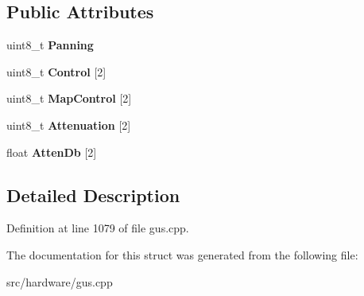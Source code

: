 \subsection*{Public Attributes}
\begin{DoxyCompactItemize}
\item 
\hypertarget{structgus__ICS2101_1_1mixcontrol_a51061e6484c9e123414be0af811b714f}{uint8\-\_\-t {\bfseries Panning}}\label{structgus__ICS2101_1_1mixcontrol_a51061e6484c9e123414be0af811b714f}

\item 
\hypertarget{structgus__ICS2101_1_1mixcontrol_abc998b7038d01a551dbc659027d54f66}{uint8\-\_\-t {\bfseries Control} \mbox{[}2\mbox{]}}\label{structgus__ICS2101_1_1mixcontrol_abc998b7038d01a551dbc659027d54f66}

\item 
\hypertarget{structgus__ICS2101_1_1mixcontrol_a916268f834849e724a87c1f6510bb964}{uint8\-\_\-t {\bfseries Map\-Control} \mbox{[}2\mbox{]}}\label{structgus__ICS2101_1_1mixcontrol_a916268f834849e724a87c1f6510bb964}

\item 
\hypertarget{structgus__ICS2101_1_1mixcontrol_afb5439928a40cd9679b7128298f92702}{uint8\-\_\-t {\bfseries Attenuation} \mbox{[}2\mbox{]}}\label{structgus__ICS2101_1_1mixcontrol_afb5439928a40cd9679b7128298f92702}

\item 
\hypertarget{structgus__ICS2101_1_1mixcontrol_afc8504acb2e1fb3afcc045e255023605}{float {\bfseries Atten\-Db} \mbox{[}2\mbox{]}}\label{structgus__ICS2101_1_1mixcontrol_afc8504acb2e1fb3afcc045e255023605}

\end{DoxyCompactItemize}


\subsection{Detailed Description}


Definition at line 1079 of file gus.\-cpp.



The documentation for this struct was generated from the following file\-:\begin{DoxyCompactItemize}
\item 
src/hardware/gus.\-cpp\end{DoxyCompactItemize}
